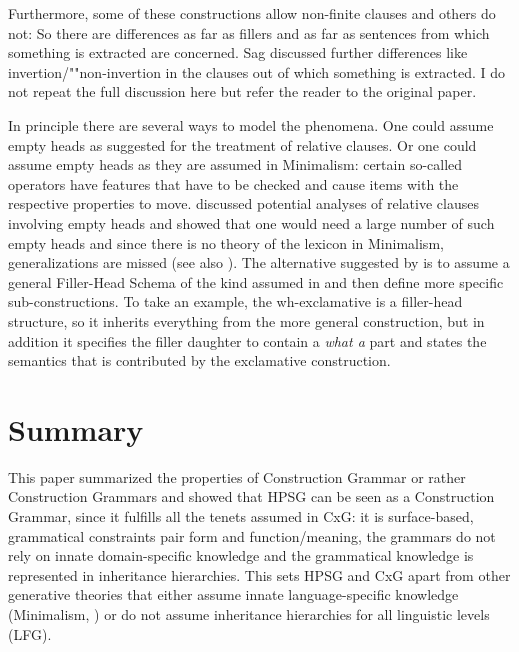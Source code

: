 \documentclass[output=paper]{langsci/langscibook}
\begin{document}
Furthermore, some of these constructions allow non-finite clauses and others do not:
\eal
{}
\zl
So there are differences as far as fillers and as far as sentences from which something is extracted
are concerned. Sag discussed further differences like invertion/""non-invertion in the clauses out of
which something is extracted. I do not repeat the full discussion here but refer the reader to the
original paper.

In principle there are several ways to model the phenomena. One could assume empty
heads as \citet[Chapter~5]{ps2} suggested for the treatment of relative clauses. Or one could assume empty
heads as they are assumed in Minimalism: certain so-called operators have features that have to be
checked and cause items with the respective properties to move. \citet{Borsley2006a} discussed potential
analyses of relative clauses involving empty heads and showed that one would need a large number of
such empty heads and since there is no theory of the lexicon in Minimalism, generalizations are
missed (see also ). The alternative suggested by
\citet{Sag2010b} is to assume a general Filler-Head Schema of the kind assumed in  and
then define more specific sub-constructions. To take an example, the wh-exclamative is a filler-head
structure, so it inherits everything from the more general construction, but in addition it
specifies the filler daughter to contain a \emph{what a} part and states the semantics that is
contributed by the exclamative construction.


\section{Summary}
\label{sec-summary}

This paper summarized the properties of Construction Grammar or rather Construction Grammars and
showed that HPSG can be seen as a Construction Grammar, since it fulfills all the tenets assumed in
CxG: it is surface-based, grammatical constraints pair form and function/meaning, the grammars do
not rely on innate domain-specific knowledge and the grammatical knowledge is represented in
inheritance hierarchies. This sets HPSG and CxG apart from other generative theories that either
assume innate language-specific knowledge (Minimalism, \eg
\citealt{Chomsky2013a,Kayne94a-u,CR2010a}) or do not assume inheritance hierarchies for all linguistic levels (\eg LFG).
\end{document}
